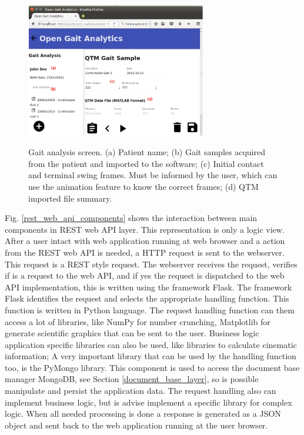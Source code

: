 \documentclass[journal]{IEEEtran}
\begin{document}
\begin{figure}[tb]
	\centering
	{\includegraphics[width=0.7\textwidth]{img/qtm_data.eps}}
	\caption{Gait analysis screen. 
		(a) Patient name;
		(b) Gait samples acquired from the patient and imported to the software;
		(c) Initial contact and terminal swing frames. Must be informed by the user,
		which can use the animation feature to know the correct frames;
		(d) QTM imported file summary.
	}
	\label{qtm_data}
\end{figure}

Fig. \ref{rest_web_api_components} shows the interaction between  main components in REST web API layer.
This representation is only a logic view.
After a user intact with web application running at web browser and a action from the REST web API is
needed, a HTTP request is sent to the webserver. This request is a REST style request.
The webserver receives the request, verifies if is a request to the web API, and if yes the
request is dispatched to the web API implementation, this is written using the framework Flask.
The framework Flask identifies the request and selects the appropriate handling function. 
This function is written in Python language. 
The request handling function can them access a lot of libraries, like NumPy for number crunching,
Matplotlib for generate scientific graphics that can be sent to the user. 
Business logic application specific libraries can also be used, like libraries to calculate
cinematic information;
A very important library that can be used by the handling function too, is the PyMongo library.
This component is used to access the document base manager MongoDB, see Section \ref{document_base_layer},
so is possible manipulate and persist the application data.
The request handling also can implement business logic, but is advise implement a specific library for
complex logic. 
When all needed processing is done a response is generated as a JSON object and sent back to 
the web application running at the user browser.
\end{document}
